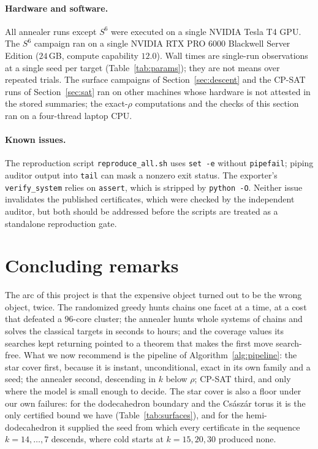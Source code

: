 \documentclass[12pt]{article}
\begin{document}
\paragraph{Hardware and software.}  All annealer runs except $S^6$ were
executed on a single NVIDIA Tesla T4 GPU\@.  The $S^6$ campaign ran on a
single NVIDIA RTX PRO 6000 Blackwell Server Edition ($24$\,GB, compute
capability $12.0$).  Wall times are single-run observations at a single
seed per target (Table~\ref{tab:params}); they are not means over
repeated trials.  The surface campaigns of Section~\ref{sec:descent}
and the CP-SAT runs of Section~\ref{sec:sat} ran on other machines whose
hardware is not attested in the stored summaries; the exact-$\rho$
computations and the checks of this section ran on a four-thread laptop CPU.

\paragraph{Known issues.}  The reproduction script
\texttt{reproduce\_all.sh} uses \texttt{set -e} without
\texttt{pipefail}; piping auditor output into \texttt{tail} can mask a
nonzero exit status.  The exporter's \texttt{verify\_system} relies on
\texttt{assert}, which is stripped by \texttt{python -O}.  Neither
issue invalidates the published certificates, which were checked by
the independent auditor, but both should be addressed before the
scripts are treated as a standalone reproduction gate.

\section{Concluding remarks}\label{sec:concl}

The arc of this project is that the expensive object turned out to be
the wrong object, twice.  The randomized greedy hunts chains one facet at
a time, at a cost that defeated a $96$-core cluster; the annealer hunts
whole systems of chains and solves the classical targets in seconds to
hours; and the coverage values its searches kept returning pointed to a
theorem that makes the first move search-free.  What we now recommend is
the pipeline of Algorithm~\ref{alg:pipeline}: the star cover first,
because it is instant, unconditional, exact in its own family and a seed;
the annealer second, descending in $k$ below $\rho$; CP-SAT third, and
only where the model is small enough to decide.  The star cover is also
a floor under our own failures: for the dodecahedron boundary and the
Cs\'asz\'ar torus it is the only certified bound we have
(Table~\ref{tab:surfaces}), and for the hemi-dodecahedron it
supplied the seed from which every certificate in the sequence
$k=14,\dots,7$ descends, where cold starts at $k=15,20,30$ produced none.
\end{document}
